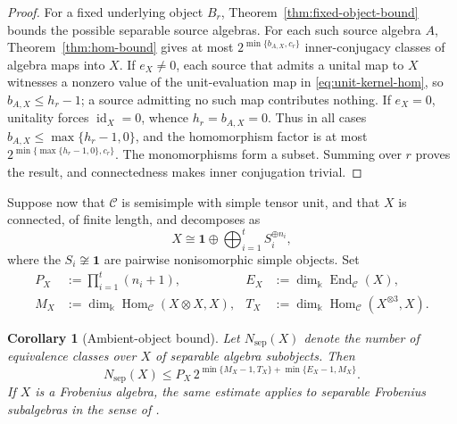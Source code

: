 \documentclass[11pt]{amsart}
\newtheorem{corollary}[theorem]{Corollary}
\theoremstyle{definition}
\theoremstyle{remark}
\newcommand{\C}{\mathcal C}
\newcommand{\one}{\mathbf 1}
\newcommand{\kk}{\Bbbk}
\DeclareMathOperator{\Hom}{Hom}
\DeclareMathOperator{\End}{End}
\DeclareMathOperator{\id}{id}
\begin{document}
\begin{proof}
For a fixed underlying object $B_r$,
Theorem~\ref{thm:fixed-object-bound} bounds the possible separable source
algebras.  For each such source algebra $A$,
Theorem~\ref{thm:hom-bound} gives at most
$2^{\min\{b_{A,X},c_r\}}$ inner-conjugacy classes of algebra maps into
$X$.  If $e_X\neq0$, each source that admits a unital map to $X$
witnesses a nonzero value of the unit-evaluation map in
\eqref{eq:unit-kernel-hom}, so $b_{A,X}\leq h_r-1$; a source admitting no
such map contributes nothing.  If $e_X=0$, unitality forces
$\id_X=0$, whence $h_r=b_{A,X}=0$.  Thus in all cases
$b_{A,X}\leq\max\{h_r-1,0\}$, and the homomorphism factor is at most
$2^{\min\{\max\{h_r-1,0\},c_r\}}$.  The monomorphisms form a subset.  Summing over
$r$ proves the result, and connectedness makes inner conjugation trivial.
\end{proof}

Suppose now that $\C$ is semisimple with simple tensor unit,
and that $X$ is connected, of finite length, and decomposes as
\begin{equation}\label{eq:target-decomposition}
 X\cong\one\oplus\bigoplus_{i=1}^t S_i^{\oplus n_i},
\end{equation}
where the $S_i\not\cong\one$ are pairwise nonisomorphic simple objects.  Set
\begin{equation}\label{eq:target-data}
\begin{aligned}
 P_X&:=\prod_{i=1}^t(n_i+1),
 &E_X&:=\dim_{\kk}\End_{\C}(X),\\
 M_X&:=\dim_{\kk}\Hom_{\C}(X\otimes X,X),
 &T_X&:=\dim_{\kk}\Hom_{\C}(X^{\otimes3},X).
\end{aligned}
\end{equation}

\begin{corollary}[Ambient-object bound]\label{cor:target-only-bound}
Let $N_{\mathrm{sep}}(X)$ denote the number of equivalence classes over $X$
of separable algebra subobjects.  Then
\begin{equation}\label{eq:target-only-bound}
 N_{\mathrm{sep}}(X)
 \leq
 P_X\,
 2^{\min\{M_X-1,T_X\}+\min\{E_X-1,M_X\}}.
\end{equation}
If $X$ is a Frobenius algebra, the same estimate applies to separable
Frobenius subalgebras in the sense of
\cite[Definition~2.6]{GhoshPalcouxExchange}.
\end{corollary}
\end{document}
